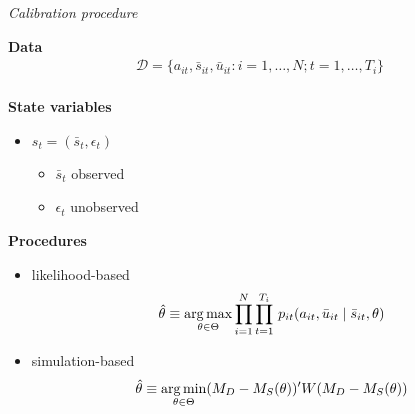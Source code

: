 \begin{frame}\begin{center}
		\LARGE\textit{Calibration procedure}
\end{center}\end{frame}
\begin{frame}

\textbf{Data}\vspace{0.3cm}
\begin{align*}
	\mathcal{D} = \{a_{it}, \bar{s}_{it}, \bar{u}_{it}: i = 1, \hdots, N; t = 1, \hdots, T_i\}\\
\end{align*}

\textbf{State variables}\vspace{0.3cm}
\begin{itemize}\setlength\itemsep{1em}
\item $s_t = (\bar{s}_t, \epsilon_t)$\medskip
\begin{itemize}\setlength\itemsep{1em}
	\item $\bar{s}_t$ observed
	\item $\epsilon_t$ unobserved
\end{itemize}
\end{itemize}
\end{frame}
\begin{frame}
\textbf{Procedures}\vspace{0.5cm}
\begin{itemize}\setlength\itemsep{1em}
\item likelihood-based
\begin{align*}
  \hat{\theta} \equiv \operatorname*{arg\,max}_{\theta \in \Theta} \prod^N_{i= 1} \prod^{T_i}_{t= 1}\, p_{it}(a_{it}, \bar{u}_{it} \mid \bar{s}_{it}, \theta)
\end{align*}
\item simulation-based
\begin{align*}
    \hat{\theta} \equiv \operatorname*{arg\,min}_{\theta \in \Theta} (M_D - M_S(\theta))' W (M_D - M_S(\theta))
\end{align*}
\end{itemize}
\end{frame}
